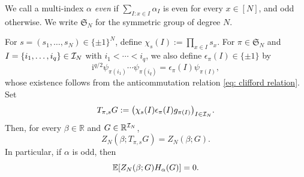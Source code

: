 \documentclass[../CLT_SYK.tex]{subfiles}
\begin{document}
{We call}  a multi-index $\alpha$ \emph{even} if $\sum_{I\colon x \in I}
\alpha_I$ is even for every $x\in[N]$, and odd otherwise. We write $\mathfrak S_N$ for the symmetric group of degree $N$. 
\begin{lemma}\label{lem: parity rule lemma}
    For $s=(s_1,\ldots,s_N)\in\{\pm1\}^N$, define
$\chi_s(I):=\prod_{x\in I}s_x$.
 {For $\pi\in\mathfrak S_N$ and $I=\{i_1,\ldots,i_q\}\in\mathcal I_N$ with $i_1<\cdots<i_q$, we also
define $\epsilon_\pi(I)\in\{\pm1\}$ by
\[
  \mathrm i^{q/2}\psi_{\pi(i_1)}\cdots\psi_{\pi(i_q)}
  =\epsilon_\pi(I)\psi_{\pi(I)},
\]
whose existence follows from the anticommutation relation \eqref{eq: clifford relation}.
Set
\[
  T_{\pi,s}G
  :=\bigl(\chi_s(I)\epsilon_\pi(I)g_{\pi(I)}\bigr)_{I\in\mathcal I_N}.
\]
Then, for every $\beta\in\mathbb R$ and $G\in\mathbb R^{\mathcal I_N}$,
\begin{equation}\label{eq:signed-permutation-invariance}
  Z_N(\beta;T_{\pi,s}G)=Z_N(\beta;G).
\end{equation}
}
    In particular, if $\alpha$ is odd, then
   \begin{equation}\label{eq:odd-coefficient-zero}
  \mathbb E[Z_N(\beta;G)H_\alpha(G)]=0.
   \end{equation}
    
\end{lemma}
\end{document}
